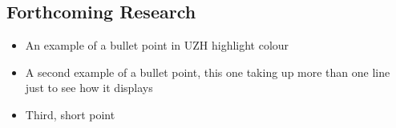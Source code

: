 \documentclass[a0, portrait]{a0paper}
\begin{document}
\begin{multicols}{3}

\section{Forthcoming Research}

\blindtext
\color{uzhockerrot100}
\begin{itemize}
 \item An example of a bullet point in UZH highlight colour
 \item A second example of a bullet point, this one taking up more than one line just to see how it displays
 \item Third, short point
\end{itemize}
\color{Black}

\singlespacing
\small
\nocite{*} %


\end{multicols}
\end{document}
